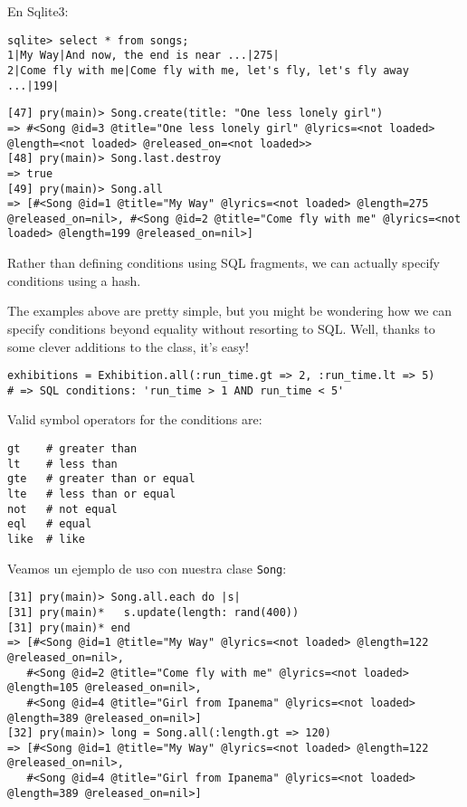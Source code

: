 En Sqlite3:
\begin{verbatim}
sqlite> select * from songs;
1|My Way|And now, the end is near ...|275|
2|Come fly with me|Come fly with me, let's fly, let's fly away ...|199|
\end{verbatim}

\begin{verbatim}
[47] pry(main)> Song.create(title: "One less lonely girl")
=> #<Song @id=3 @title="One less lonely girl" @lyrics=<not loaded> @length=<not loaded> @released_on=<not loaded>>
[48] pry(main)> Song.last.destroy
=> true
[49] pry(main)> Song.all
=> [#<Song @id=1 @title="My Way" @lyrics=<not loaded> @length=275 @released_on=nil>, #<Song @id=2 @title="Come fly with me" @lyrics=<not loaded> @length=199 @released_on=nil>]
\end{verbatim}

Rather than defining conditions using SQL fragments, we can actually specify conditions using a hash.

The examples above are pretty simple, but you might be wondering
how we can specify conditions beyond equality without resorting to
SQL. Well, thanks to some clever additions to the \Symbol{} class,
it's easy!

\begin{verbatim}
exhibitions = Exhibition.all(:run_time.gt => 2, :run_time.lt => 5)
# => SQL conditions: 'run_time > 1 AND run_time < 5'
\end{verbatim}
Valid symbol operators for the conditions are:

\begin{verbatim}
gt    # greater than
lt    # less than
gte   # greater than or equal
lte   # less than or equal
not   # not equal
eql   # equal
like  # like
\end{verbatim}
Veamos un ejemplo de uso con nuestra clase \verb|Song|:
\begin{verbatim}
[31] pry(main)> Song.all.each do |s|
[31] pry(main)*   s.update(length: rand(400))
[31] pry(main)* end  
=> [#<Song @id=1 @title="My Way" @lyrics=<not loaded> @length=122 @released_on=nil>,
   #<Song @id=2 @title="Come fly with me" @lyrics=<not loaded> @length=105 @released_on=nil>,
   #<Song @id=4 @title="Girl from Ipanema" @lyrics=<not loaded> @length=389 @released_on=nil>]
[32] pry(main)> long = Song.all(:length.gt => 120)
=> [#<Song @id=1 @title="My Way" @lyrics=<not loaded> @length=122 @released_on=nil>,
   #<Song @id=4 @title="Girl from Ipanema" @lyrics=<not loaded> @length=389 @released_on=nil>]
\end{verbatim}

